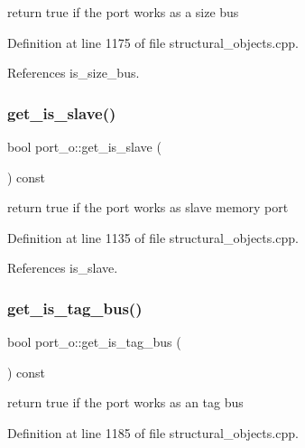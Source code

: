 return true if the port works as a size bus 



Definition at line 1175 of file structural\+\_\+objects.\+cpp.



References is\+\_\+size\+\_\+bus.

\mbox{\label{structport__o_a48f4b97f6689fbebff334bf13d81088b}} 
\subsubsection{\texorpdfstring{get\+\_\+is\+\_\+slave()}{get\_is\_slave()}}
{\footnotesize\ttfamily bool port\+\_\+o\+::get\+\_\+is\+\_\+slave (\begin{DoxyParamCaption}{ }\end{DoxyParamCaption}) const}



return true if the port works as slave memory port 



Definition at line 1135 of file structural\+\_\+objects.\+cpp.



References is\+\_\+slave.

\mbox{\label{structport__o_a721a7b8787a16242efd1fe22478ad8e1}} 
\subsubsection{\texorpdfstring{get\+\_\+is\+\_\+tag\+\_\+bus()}{get\_is\_tag\_bus()}}
{\footnotesize\ttfamily bool port\+\_\+o\+::get\+\_\+is\+\_\+tag\+\_\+bus (\begin{DoxyParamCaption}{ }\end{DoxyParamCaption}) const}



return true if the port works as an tag bus 



Definition at line 1185 of file structural\+\_\+objects.\+cpp.



